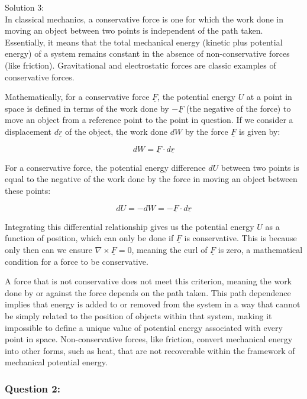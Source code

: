 \documentclass[a4paper,11pt]{article}
\begin{document}
\noindent Solution 3: \\

In classical mechanics, a conservative force is one for which the work done in moving an object between two points is independent of the path taken. Essentially, it means that the total mechanical energy (kinetic plus potential energy) of a system remains constant in the absence of non-conservative forces (like friction). Gravitational and electrostatic forces are classic examples of conservative forces.

Mathematically, for a conservative force \( \underline{F} \), the potential energy \( U \) at a point in space is defined in terms of the work done by \( -\underline{F} \) (the negative of the force) to move an object from a reference point to the point in question. If we consider a displacement \( d\underline{r} \) of the object, the work done \( dW \) by the force \( \underline{F} \) is given by:

\[ dW = \underline{F} \cdot d\underline{r} \]

For a conservative force, the potential energy difference \( dU \) between two points is equal to the negative of the work done by the force in moving an object between these points:

\[ dU = -dW = -\underline{F} \cdot d\underline{r} \]

Integrating this differential relationship gives us the potential energy \( U \) as a function of position, which can only be done if \( \underline{F} \) is conservative. This is because only then can we ensure \( \nabla \times \underline{F} = 0 \), meaning the curl of \( \underline{F} \) is zero, a mathematical condition for a force to be conservative.

A force that is not conservative does not meet this criterion, meaning the work done by or against the force depends on the path taken. This path dependence implies that energy is added to or removed from the system in a way that cannot be simply related to the position of objects within that system, making it impossible to define a unique value of potential energy associated with every point in space. Non-conservative forces, like friction, convert mechanical energy into other forms, such as heat, that are not recoverable within the framework of mechanical potential energy.

\subsubsection*{Question 2:}
\end{document}
